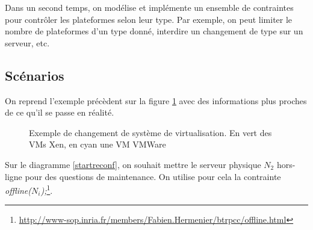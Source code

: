 \documentclass[a4paper]{article}
\begin{document}
Dans un second temps, on modélise et implémente un ensemble de contraintes
pour contrôler les plateformes selon leur type. Par exemple, on peut limiter le
nombre de plateformes d'un type donné, interdire un changement de type
sur un serveur, etc.

\subsection{Scénarios}
On reprend l'exemple précèdent sur la figure \ref{reconf} avec des
informations plus proches de ce qu'il se passe en réalité.
\begin{figure}[!ht]
	\centering
	\caption{\label{reconf} Exemple de changement de système de
		virtualisation. En vert des VMs Xen, en cyan une VM VMWare}
\end{figure}

Sur le diagramme \ref{startreconf}, on souhait mettre le serveur physique
$N_2$ hors-ligne pour des questions de maintenance. On utilise pour cela
la contrainte \textit{offline($N_i$);}\footnote{\url{http://www-sop.inria.fr/members/Fabien.Hermenier/btrpcc/offline.html}}.
\end{document}
